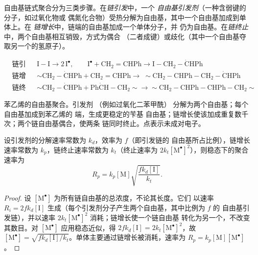 \begin{definition}[链式聚合的步骤]\label{def:b2:polymer-synthesis:chain-steps}
自由基链式聚合分为三类步骤。在\emph{链引发}中，一个
\emph{自由基引发剂}（一种含弱键的分子，如过氧化物或
偶氮化合物）受热分解为自由基，其中一个自由基加成到单体上。在
\emph{链增长}中，链端的自由基加成一个单体分子，并
仍为自由基。在\emph{链终止}中，两个自由基相互销毁，方式为偶合
（二者成键）或歧化（其中一个自由基夺取另一个的氢原子）。
\end{definition}

\begin{omfigure}
\begin{align*}
&\text{链引发：} && \mathrm{I{-}I} \longrightarrow 2\,\mathrm{I^{\bullet}}, \qquad
\mathrm{I^{\bullet} + CH_2{=}CHPh \longrightarrow I{-}CH_2{-}\dot{C}HPh} \\
&\text{链增长：} && {\sim}\mathrm{CH_2{-}\dot{C}HPh + CH_2{=}CHPh \longrightarrow}\;
{\sim}\mathrm{CH_2{-}CHPh{-}CH_2{-}\dot{C}HPh} \\
&\text{链终止：} && {\sim}\mathrm{CH_2{-}\dot{C}HPh + Ph\dot{C}H{-}CH_2}{\sim} \longrightarrow
{\sim}\mathrm{CH_2{-}CHPh{-}CHPh{-}CH_2}{\sim}
\end{align*}

{\small 苯乙烯的自由基聚合。引发剂 （例如过氧化二苯甲酰）
分解为两个自由基；每个自由基加成到苯乙烯的  端，生成更稳定的苄基
自由基；链增长使该加成重复数千次；两个链自由基偶合，使两条
链同时终止。点表示未成对电子。}
\end{omfigure}

\begin{theorem}[自由基聚合速率]\label{thm:b2:polymer-synthesis:radical-rate}
设引发剂的分解速率常数为 $k_d$，效率为 $f$（即引发链的
自由基所占比例），链增长速率常数为 $k_p$，链终止速率常数为 $k_t$（终止速率为 $2k_t
[\mathrm{M^\bullet}]^2$），则稳态下的聚合速率为
\begin{equation*}
R_p = k_p [\mathrm M] \sqrt{\frac{f k_d [\mathrm I]}{k_t}}.
\end{equation*}
\end{theorem}

\begin{proof}
设 $[\mathrm{M^\bullet}]$ 为所有链自由基的总浓度，不论其长度。它们
以速率 $R_i = 2fk_d[\mathrm I]$ 生成（每个引发剂分子产生两个自由基，其中比例为 $f$ 的
自由基引发链），并以速率 $2k_t[\mathrm{M^\bullet}]^2$ 消耗；链增长使一个链自由基
转化为另一个，不改变其数目。对
$[\mathrm{M^\bullet}]$ 应用稳态近似，得 $2fk_d[\mathrm I] = 2k_t[\mathrm{M^\bullet}]^2$，故 $[\mathrm{M^\bullet}] =
\sqrt{fk_d[\mathrm I]/k_t}$。单体主要通过链增长被消耗，速率为 $R_p =
k_p[\mathrm M][\mathrm{M^\bullet}]$。
\end{proof}

